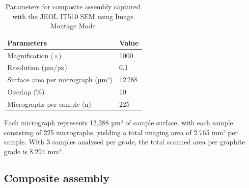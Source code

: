 \documentclass[review]{elsarticle}
\begin{document}
\begin{table}
  \centering
  \caption{Summary of the contrast and brightness applied by the automatic adjustment of the SEM software package for all micrographs, expressed as percentages of respective maxima for each sample.}
  \label{tab:contrast-brightness-summary}
\end{table}

\begin{table}
  \centering
  \caption{Parameters for composite assembly captured with the JEOL IT510 SEM using Image Montage Mode}
  \label{tab:microscopy_parameters}
  \begin{tabular}{l l}
    \hline
    Parameters & Value \\
    \hline
    Magnification ($\times$)                    & 1000 \\
    Resolution (µm/px)               & 0.1 \\
    Surface area per micrograph (µm²) & 12\,288 \\
    Overlap (\%)                          & 10 \\
    Micrographs per sample (n)            & 225 \\
    \hline
  \end{tabular}%
\end{table}

Each micrograph represents 12,288 µm² of sample surface, with each sample
consisting of 225 micrographs, yielding a total imaging area of 2.765 mm² per
sample. With 3 samples analysed per grade, the total scanned area per graphite
grade is 8.294 mm². 

\subsection{Composite assembly}
\end{document}
